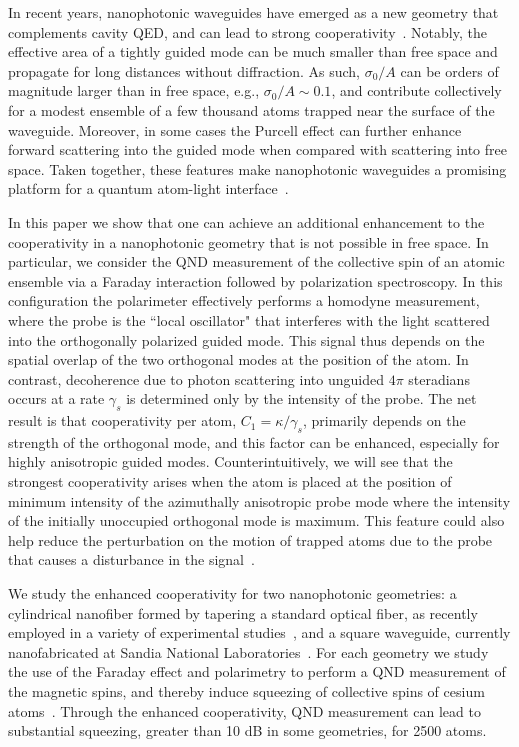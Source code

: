 \documentclass[aps,pra,twocolumn,superscriptaddress]{revtex4-1} %
\begin{document}
In recent years, nanophotonic waveguides have emerged as a new geometry that complements cavity QED, and can lead to strong cooperativity~\cite{Yu2014,Hung2013,Goban2014,Goban2012,Sayrin2015,Sayrin2015a}.  Notably, the effective area of a tightly guided mode can be much smaller than free space and propagate for long distances without diffraction.  As such,  $\sigma_0/A$ can be orders of magnitude larger than in free space, e.g., $\sigma_0/A \sim 0.1$, and contribute collectively for a modest ensemble of a few thousand atoms trapped near the surface of the waveguide.  Moreover, in some cases the Purcell effect can further enhance forward scattering into the guided mode when compared with scattering into free space.  Taken together, these features make  nanophotonic waveguides a promising platform for a quantum atom-light interface~\cite{Douglas2015,Chang2013,Asenjo-Garcia2017Exponential,Vetsch2010Optical,Dawkins2011,Qi2016}.

In this paper we show that one can achieve an additional enhancement to the cooperativity in a nanophotonic geometry that is not possible in free space. In particular, we consider the QND measurement of the collective spin of an atomic ensemble via a Faraday interaction followed by polarization spectroscopy.  In this configuration the polarimeter effectively performs a homodyne measurement, where the probe is the ``local oscillator" that interferes with the light scattered into the orthogonally polarized guided mode.   This signal thus depends on the spatial overlap of the two orthogonal modes at the position of the atom.  In contrast, decoherence due to photon scattering into unguided $4 \pi$ steradians occurs at a rate $\gamma_s$ is determined only by the intensity of the probe.   The net result is that cooperativity per atom, $C_1 = \kappa/\gamma_s$, primarily depends on the strength of the orthogonal mode, and this factor can be enhanced, especially for highly anisotropic guided modes.  Counterintuitively, we will see that the strongest cooperativity arises when the atom is placed at the position of  minimum intensity of the azimuthally anisotropic probe mode where the intensity of the initially unoccupied orthogonal mode is maximum. This feature could also help reduce the perturbation on the motion of trapped atoms due to the probe that causes a disturbance in the signal~\cite{Solano2017Dynamics}.

We study the enhanced cooperativity for two nanophotonic geometries: a cylindrical nanofiber formed by tapering a standard optical fiber, as recently employed in a variety of experimental studies~\cite{Nayak2008,Vetsch2010Optical,Vetsch2010Opticala,OShea2013,Goban2014,Grover2015,Lee2015,Beguin2014}, and a square waveguide, currently nanofabricated at Sandia National Laboratories~\cite{Jau2016Development,Lee2017Characterizations,Lee2013}.  For each geometry we study the use of the Faraday effect and polarimetry to perform a QND measurement of the magnetic spins, and thereby induce squeezing of collective spins of cesium atoms~\cite{Takahashi1999Quantum,Kuzmich1999,Kuzmich2000,Deutsch2010a,Smith2003a}.  Through the enhanced cooperativity, QND measurement can lead to substantial squeezing, greater than 10 dB in some geometries, for 2500 atoms.
\end{document}
